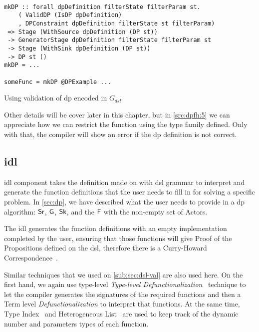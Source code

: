 \begin{listing}[H]
  \begin{verbatim}

mkDP :: forall dpDefinition filterState filterParam st.
    ( ValidDP (IsDP dpDefinition)
    , DPConstraint dpDefinition filterState st filterParam)
 => Stage (WithSource dpDefinition (DP st)) 
 -> GeneratorStage dpDefinition filterState filterParam st  
 -> Stage (WithSink dpDefinition (DP st))  
 -> DP st ()
mkDP = ...

someFunc = mkDP @DPExample ...

  \end{verbatim}
  \caption{Using validation of \acrshort{dp} encoded in $G_{dsl}$}
  \label{src:dpfh:5}
\end{listing}

Other details will be cover later in this chapter, but in \autoref{src:dpfh:5} we can appreciate how we can restrict the function using
the type family defined. Only with that, the compiler will show an error if the \acrshort{dp} definition is not correct.

\subsection{\acrfull{idl}}
\acrshort{idl} component takes the definition made on with \acrshort{dsl} grammar to interpret and generate the function definitions
that the user needs to fill in for solving a specific problem. In \autoref{sec:dp}, we have described what the user needs to provide in a \acrshort{dp} algorithm: $\mathsf{Sr}$, $\mathsf{G}$, $\mathsf{Sk}$, and the $\mathsf{F}$ with the non-empty set of Actors.

The \acrshort{idl} generates the function definitions with an empty implementation completed by the user, ensuring that those functions will give Proof of the Propositions defined on the \acrshort{dsl}, therefore there is a Curry-Howard Correspondence~\cite{curryhoward}.

Similar techniques that we used on \autoref{sub:sec:dsl-val} are also used here. On the first hand, we again use type-level \emph{Type-level Defunctionalization}~\cite{defunctionalization, fun-type-function-haskell} technique to 
let the compiler generates the signatures of the required functions and then a Term level \emph{Defunctionalization} to interpret that functions.
At the same time, Type Index~\cite{type-index} and Heterogeneous List~\cite{hlist} are used to keep track of the dynamic number and parameters types of each 
function. 

